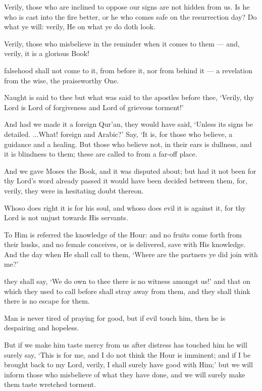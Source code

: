 \documentclass[fontsize=14pt, letterpaper, notitlepage, openany, DIV=12]{scrbook} %
\begin{document}
\noindent[41:40]
Verily, those who are inclined to oppose our signs are not hidden from us. Is he who is
cast into the fire better, or he who comes safe on the resurrection day? Do what ye will: verily,
He on what ye do doth look.

\noindent[41:41]
Verily, those who misbelieve in the reminder when it comes to them --- and, verily, it is a
glorious Book!

\noindent[41:42]
falsehood shall not come to it, from before it, nor from behind it --- a revelation from the
wise, the praiseworthy One.

\noindent[41:43]
Naught is said to thee but what was said to the apostles before thee, `Verily, thy Lord is
Lord of forgiveness and Lord of grievous torment!'

\noindent[41:44]
And had we made it a foreign Qur'an, they would have said, `Unless its signs be detailed.
...What! foreign and Arabic?' Say, `It is, for those who believe, a guidance and a healing. But
those who believe not, in their ears is dullness, and it is blindness to them; these are called to
from a far-off place.

\noindent[41:45]
And we gave Moses the Book, and it was disputed about; but had it not been for thy
Lord's word already passed it would have been decided between them, for, verily, they were in
hesitating doubt thereon.

\noindent[41:46]
Whoso does right it is for his soul, and whoso does evil it is against it, for thy Lord is not
unjust towards His servants.

\noindent[41:47]
To Him is referred the knowledge of the Hour: and no fruits come forth from their husks,
and no female conceives, or is delivered, save with His knowledge. And the day when He shall
call to them, `Where are the partners ye did join with me?'

\noindent[41:48]
they shall say, `We do own to thee there is no witness amongst us!' and that on which
they used to call before shall stray away from them, and they shall think there is no escape for
them.

\noindent[41:49]
Man is never tired of praying for good, but if evil touch him, then he is despairing and
hopeless.

\noindent[41:50]
But if we make him taste mercy from us after distress has touched him he will surely say,
`This is for me, and I do not think the Hour is imminent; and if I be brought back to my Lord,
verily, I shall surely have good with Him;' but we will inform those who misbelieve of what they
have done, and we will surely make them taste wretched torment.
\end{document}
